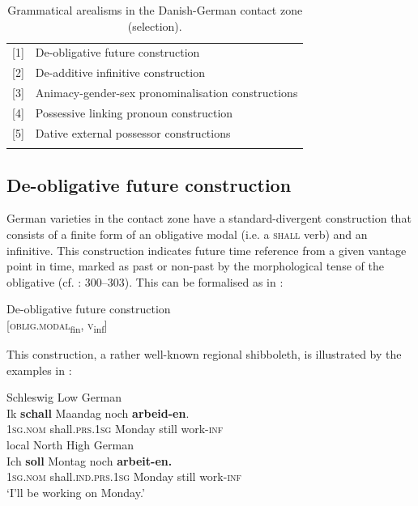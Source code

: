 \documentclass[output=paper]{langsci/langscibook}
\begin{document}
\begin{table}
\begin{tabularx}{\textwidth}{lQ}
\lsptoprule
{[1]} & {De-obligative future construction}\\
{[2]} & {De-additive infinitive construction}\\
{[3]} & {Animacy-gender-sex pronominalisation constructions}\\
{[4]} & {Possessive linking pronoun construction}\\
{[5]} & Dative external possessor constructions\\
\lspbottomrule
\end{tabularx}
\caption{Grammatical arealisms in the Danish-German contact zone (selection).\label{tab:hoeder:2}}
\end{table}

\subsection{De-obligative future construction}
\label{sec:hoeder:4.2}

German varieties in the contact zone have a standard-divergent construction that consists of a finite form of an obligative modal (i.e. a \textsc{shall} verb) and an infinitive. This construction indicates future time reference from a given vantage point in time, marked as past or non-past by the morphological tense of the obligative (cf. \citealt{Hoder.2016b}: 300--303). This can be formalised as in :

\ea\label{ex:hoeder:2}
	De-obligative future construction\\
    {[}\textsc{oblig.modal}\textsubscript{fin}, \textsc{v}\textsubscript{inf}{]}
\z
    
This construction, a rather well-known regional shibboleth, is illustrated by the examples in :


\ea\label{ex:hoeder:3}
	\ea\label{ex:hoeder:3a}
	Schleswig Low German\\
	\gll Ik \textbf{schall} Maandag noch \textbf{arbeid-en}.\\
     \textsc{1sg.nom} shall\textsc{.prs.1sg} Monday still work-\textsc{inf}\\
	
	\ex\label{ex:hoeder:3b}
	local North High German\\
	\gll Ich \textbf{soll} Montag noch \textbf{arbeit-en.}\\
     1\textsc{sg.nom} shall.\textsc{ind.prs}.1\textsc{sg}{} Monday still{} work-\textsc{inf}\\
	\glt `I’ll be{} working on Monday.'
\z
\z
\end{document}
